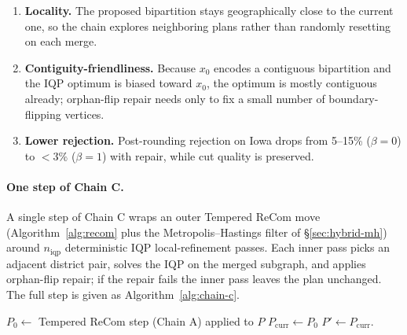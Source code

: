 \documentclass[11pt]{article}
\begin{document}
\begin{enumerate}
  \item \textbf{Locality.} The proposed bipartition stays geographically
    close to the current one, so the chain explores neighboring
    plans rather than randomly resetting on each merge.
  \item \textbf{Contiguity-friendliness.} Because $x_0$ encodes a
    contiguous bipartition and the IQP optimum is biased toward $x_0$,
    the optimum is mostly contiguous already; orphan-flip repair
    needs only to fix a small number of boundary-flipping vertices.
  \item \textbf{Lower rejection.} Post-rounding rejection on Iowa
    drops from 5--15\% ($\beta = 0$) to $<3\%$ ($\beta = 1$) with
    repair, while cut quality is preserved.
\end{enumerate}

\paragraph{One step of Chain C.}\label{sec:chain-c-step}
A single step of Chain C wraps an outer Tempered ReCom move
(Algorithm~\ref{alg:recom} plus the Metropolis--Hastings filter of
\S\ref{sec:hybrid-mh}) around $n_{\mathrm{iqp}}$ deterministic
IQP local-refinement passes. Each inner pass picks an adjacent district
pair, solves the IQP on the merged subgraph, and applies orphan-flip
repair; if the repair fails the inner pass leaves the plan unchanged.
The full step is given as Algorithm~\ref{alg:chain-c}.

\begin{algorithm}[H]
\caption{One step of Chain C}\label{alg:chain-c}
$P_0 \gets $ Tempered ReCom step (Chain A) applied to $P$\;
$P_{\mathrm{curr}} \gets P_0$\;
\Return $P' \gets P_{\mathrm{curr}}$.
\end{algorithm}
\end{document}
